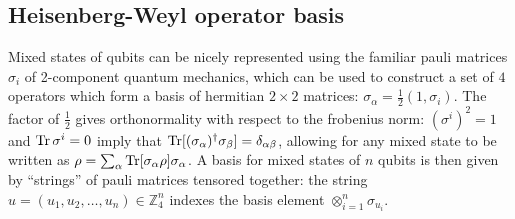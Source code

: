 \documentclass{article}
\begin{document}
\subsection{Heisenberg-Weyl operator basis}

Mixed states of qubits can be nicely represented using the familiar pauli matrices $\sigma_i$ of 2-component quantum mechanics, which can be used to construct a set of $4$ operators which form a basis of hermitian $2\times 2$ matrices: $\sigma_\alpha=\frac{1}{2}(1,\sigma_i).$ The factor of $\frac{1}{2}$ gives orthonormality with respect to the frobenius norm: $(\sigma^i)^2=1$ and $\operatorname{Tr} \sigma^i=0$ imply that $\operatorname{Tr}[(\sigma_\alpha)^\dagger\sigma_\beta]=\delta_{\alpha\beta}$, allowing for any mixed state to be written as $\rho=\sum_\alpha\operatorname{Tr}[\sigma_\alpha\rho]\sigma_\alpha$. A basis for mixed states of $n$ qubits is then given by ``strings'' of pauli matrices tensored together: the string $u=(u_1,u_2,\ldots,u_n)\in \mathbb Z_4^{n}$ indexes the basis element $\otimes_{i=1}^n \sigma_{u_i}$.
\end{document}
